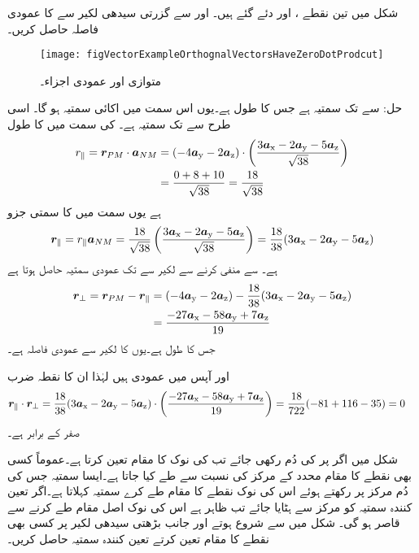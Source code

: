 شکل  میں تین نقطے ،  اور  دئے گئے ہیں۔  اور  سے گزرتی سیدھی لکیر سے  کا عمودی فاصلہ حاصل کریں۔ 
\begin{figure}
\centering
\texttt{[image: figVectorExampleOrthognalVectorsHaveZeroDotProdcut]}
\caption{متوازی اور عمودی اجزاء۔}
\label{شکل_سمتیہ_مثال_عمودی_سمتیات_کا_نقطہ_ضرب_صفر}
\end{figure}

حل: سے  تک سمتیہ  ہے جس کا طول  ہے۔یوں اس سمت میں اکائی سمتیہ  ہو گا۔ اسی طرح  سے  تک سمتیہ  ہے۔ کی سمت میں  کا طول
\begin{align*}
r_{\parallel}={{\boldsymbol{r}}}_{PM} \cdot {\ensuremath{{\boldsymbol{a}}}}_{NM}&=(-4{\boldsymbol{a}}_{\textup{y}}-2{\boldsymbol{a}}_{\textup{z}}) \cdot \left(\frac{3{\boldsymbol{a}}_{\textup{x}}-2{\boldsymbol{a}}_{\textup{y}}-5{\boldsymbol{a}}_{\textup{z}}}{\sqrt{38}}\right) \\
&=\frac{0+8+10}{\sqrt{38}}=\frac{18}{\sqrt{38}}
\end{align*}
ہے یوں  سمت میں  کا سمتی جزو
\begin{align*}
{\ensuremath{{\boldsymbol{r}}}}_{\parallel}=r_{\parallel} {{\boldsymbol{a}}}_{NM}=\frac{18}{\sqrt{38}}\left(\frac{3{\boldsymbol{a}}_{\textup{x}}-2{\boldsymbol{a}}_{\textup{y}}-5{\boldsymbol{a}}_{\textup{z}}}{\sqrt{38}}\right)=\frac{18}{38} (3{\boldsymbol{a}}_{\textup{x}}-2{\boldsymbol{a}}_{\textup{y}}-5{\boldsymbol{a}}_{\textup{z}})
\end{align*}
ہے۔ سے  منفی کرنے سے لکیر سے  تک عمودی سمتیہ  حاصل ہوتا ہے
\begin{align*}
{\ensuremath{{\boldsymbol{r}}}}_{\perp}={{\boldsymbol{r}}}_{PM}-{{\boldsymbol{r}}}_{\parallel}&=(-4{\boldsymbol{a}}_{\textup{y}}-2{\boldsymbol{a}}_{\textup{z}})-\frac{18}{38} (3{\boldsymbol{a}}_{\textup{x}}-2{\boldsymbol{a}}_{\textup{y}}-5{\boldsymbol{a}}_{\textup{z}})\\
&=\frac{-27{\boldsymbol{a}}_{\textup{x}}-58{\boldsymbol{a}}_{\textup{y}}+7{\boldsymbol{a}}_{\textup{z}}}{19}
\end{align*}
جس کا طول  ہے۔یوں  کا لکیر سے عمودی فاصلہ  ہے۔

 اور  آپس میں عمودی ہیں لہٰذا ان  کا نقطہ ضرب
\begin{align*}
{\ensuremath{{\boldsymbol{r}}}}_\parallel \cdot {\ensuremath{{\boldsymbol{r}}}}_\perp&=\frac{18}{38} (3{\boldsymbol{a}}_{\textup{x}}-2{\boldsymbol{a}}_{\textup{y}}-5{\boldsymbol{a}}_{\textup{z}}) \cdot \left(\frac{-27{\boldsymbol{a}}_{\textup{x}}-58{\boldsymbol{a}}_{\textup{y}}+7{\boldsymbol{a}}_{\textup{z}}}{19}\right)=\frac{18}{722}(-81+116-35)=0
\end{align*}
صفر کے برابر ہے۔

شکل  میں اگر  پر  کی دُم رکھی جائے تب   کی نوک  کا مقام تعین کرتا ہے۔عموماً کسی بھی نقطے کا مقام محدد کے مرکز  کی نسبت سے طے کیا جاتا ہے۔ایسا سمتیہ جس کی دُم مرکز پر رکھتے ہوئے اس کی نوک نقطے کا مقام طے کرے   سمتیہ کہلاتا ہے۔اگر تعین کنندہ سمتیہ کو مرکز سے ہٹایا جائے تب ظاہر ہے اس کی نوک اصل مقام طے کرنے سے قاصر ہو گی۔
شکل  میں  سے شروع ہوتے اور   جانب بڑھتی سیدھی لکیر پر کسی بھی نقطے کا مقام تعین کرتے تعین کنندہ سمتیہ حاصل کریں۔

